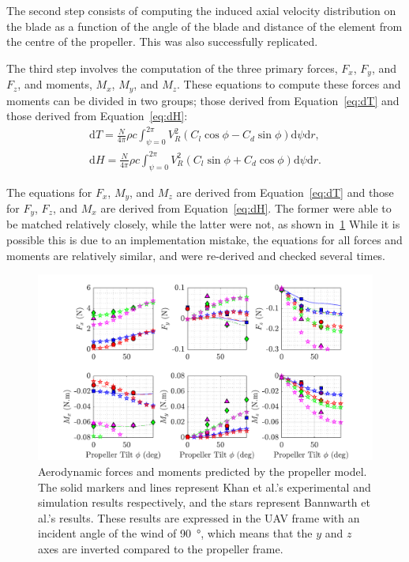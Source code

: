 \documentclass[a4paper,12pt]{article}
\begin{document}
            The second step consists of computing the induced axial velocity distribution on the blade as a function of the angle of the blade and distance of the element from the centre of the propeller. This was also successfully replicated.

            The third step involves the computation of the three primary forces, \(F_x\), \(F_y\), and \(F_z\), and moments, \(M_x\), \(M_y\), and \(M_z\). These equations to compute these forces and moments can be divided in two groups; those derived from Equation~\eqref{eq:dT} and those derived from Equation~\eqref{eq:dH}:
            \begin{align}
                \mathrm{d} T = \frac{N}{4\pi}\rho c \int_{\psi=0}^{2\pi} V^2_R \left( C_l \cos \phi - C_d \sin \phi \right) \mathrm{d} \psi \mathrm{d} r,  \label{eq:dT} \\
                \mathrm{d} H = \frac{N}{4\pi}\rho c \int_{\psi=0}^{2\pi} V^2_R \left( C_l \sin \phi + C_d \cos \phi \right) \mathrm{d} \psi \mathrm{d} r. \label{eq:dH}
            \end{align}

            The equations for \(F_x\), \(M_y\), and \(M_z\) are derived from Equation~\eqref{eq:dT} and those for \(F_y\), \(F_z\), and \(M_x\) are derived from Equation~\eqref{eq:dH}. The former were able to be matched relatively closely, while the latter were not, as shown in~\ref{fig:aero_fm} While it is possible this is due to an implementation mistake, the equations for all forces and moments are relatively similar, and were re-derived and checked several times.

            \begin{figure}[h!]
                \centering%
                \includegraphics{aero_fm.pdf}%
                \caption{Aerodynamic forces and moments predicted by the propeller model. The solid markers and lines represent Khan et al.'s experimental and simulation results respectively, and the stars represent Bannwarth et al.'s results. These results are expressed in the UAV frame with an incident angle of the wind of \SI{90}{\degree}, which means that the \(y\) and \(z\) axes are inverted compared to the propeller frame.}\label{fig:aero_fm}
            \end{figure}
\end{document}
